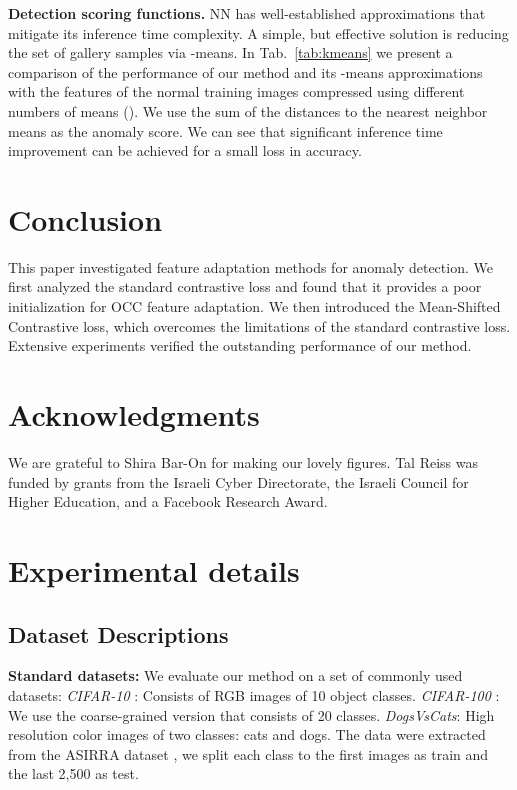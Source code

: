 \documentclass[letterpaper]{article} \usepackage{aaai23}  \usepackage{times}  \usepackage{helvet}  \usepackage{courier}  \usepackage[hyphens]{url}  \usepackage{graphicx} \usepackage{amsmath, amssymb}
\begin{document}
\textbf{Detection scoring functions.} NN has well-established approximations that mitigate its inference time complexity. A simple, but effective solution is reducing the set of gallery samples via -means. In Tab.~\ref{tab:kmeans} we present a comparison of the performance of our method and its -means approximations with the features of the normal training images compressed using different numbers of means (). We use the sum of the distances to the nearest neighbor means as the anomaly score. We can see that significant inference time improvement can be achieved for a small loss in accuracy.


\section{Conclusion}
This paper investigated feature adaptation methods for anomaly detection. We first analyzed the standard contrastive loss and found that it provides a poor initialization for OCC feature adaptation. We then introduced the Mean-Shifted Contrastive loss, which overcomes the limitations of the standard contrastive loss. Extensive experiments verified the outstanding performance of our method.

\section*{Acknowledgments}
We are grateful to Shira Bar-On for making our lovely figures. Tal Reiss was funded by grants from the Israeli Cyber Directorate, the Israeli Council for Higher Education, and a Facebook Research Award.



\newpage
\clearpage

\appendix

\section{Experimental details}

\label{appendix:exp_details}

\subsection{Dataset Descriptions}
\label{appendix:datasets}
\textbf{Standard datasets:} We evaluate our method on a set of commonly used datasets: \textit{CIFAR-10} \cite{krizhevsky2009learning}:  Consists of RGB images of 10  object classes. \textit{CIFAR-100} \cite{krizhevsky2009learning}:  We use the coarse-grained version that consists of 20 classes. \textit{DogsVsCats}: High resolution color images of two classes: cats and dogs. The data were extracted from the ASIRRA dataset \cite{elson2007asirra}, we split each class to the first  images as train and the last 2,500 as test.
\end{document}
